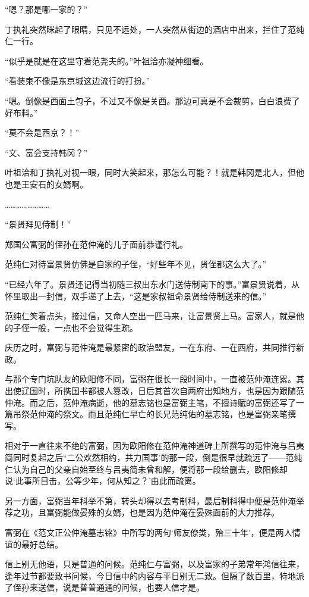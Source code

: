 “嗯？那是哪一家的？”

丁执礼突然眯起了眼睛，只见不远处，一人突然从街边的酒店中出来，拦住了范纯仁一行。

“似乎是就是在这里守着范尧夫的。”叶祖洽亦凝神细看。

“看装束不像是东京城这边流行的打扮。”

“嗯。倒像是西面土包子，不过又不像是关西。那边可真是不会裁剪，白白浪费了好布料。”

“莫不会是西京？！”

“文、富会支持韩冈？”

叶祖洽和丁执礼对视一眼，同时大笑起来，那怎么可能？！就是韩冈是北人，但他也是王安石的女婿啊。

……………………

“景贤拜见侍制！”

郑国公富弼的侄孙在范仲淹的儿子面前恭谨行礼。

范纯仁对待富景贤仿佛是自家的子侄，“好些年不见，贤侄都这么大了。”

“已经六年了。景贤还记得当初随三叔出东水门送侍制南下的事。”富景贤说着，从怀里取出一封信，双手递了上去，“这是家叔祖命景贤给侍制送来的信。”

范纯仁笑着点头，接过信，又命人空出一匹马来，让富景贤上马。富家人，就是他的子侄一般，一点也不会觉得生疏。

庆历之时，富弼与范仲淹是最紧密的政治盟友，一在东府、一在西府，共同推行新政。

与那个专门坑队友的欧阳修不同，富弼在很长一段时间中，一直被范仲淹连累。其出使辽国时，所携国书都被人篡改，日后其首次自两府出知地方，也是因为跟随范仲淹。而之后，范仲淹病逝，他的墓志铭也是富弼主笔，不擅诗赋的富弼还写了一篇吊祭范仲淹的祭文。而且范纯仁早亡的长兄范纯佑的墓志铭，也是富弼亲笔撰写。

相对于一直往来不绝的富弼，因为欧阳修在范仲淹神道碑上所撰写的范仲淹与吕夷简同时复起之后“二公欢然相约，共力国事’的那一段，倒是很早就疏远了——范纯仁认为自己的父亲自始至终与吕夷简未曾和解，便将那一段给删去，欧阳修却说‘此事所目击，公等少年，何从知之？’由此而疏离。

另一方面，富弼当年科举不第，转头却得以去考制科，最后制科得中便是范仲淹举荐之功，且富弼能做晏殊的女婿，也是因为范仲淹在晏殊面前的大力推荐。

富弼在《范文正公仲淹墓志铭》中所写的两句‘师友僚类，殆三十年’，便是两人情谊的最好总结。

信上别无他语，只是普通的问候。范纯仁与富弼，以及富家的子弟常年鸿信往来，逢年过节都要致书问候，今日信中的内容与平日别无二致。但隔了数百里，特地派了侄孙来送信，说是普普通通的问候，也要人信才是。

